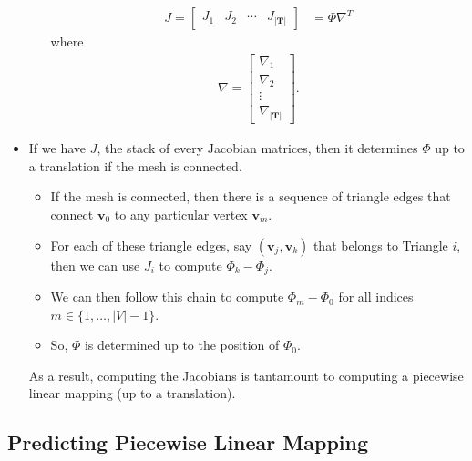 \documentclass[10pt]{article}
\newcommand{\ve}[1]{\mathbf{#1}}
\begin{document}
\begin{itemize}
\begin{itemize}
\begin{align*}
            J = \begin{bmatrix}
                J_1 & J_2 & \cdots & J_{|\ve{T}|}                
            \end{bmatrix}
            &= \Phi \nabla^T
        \end{align*}
        where
        \begin{align*}
            \nabla = \begin{bmatrix}
                \nabla_1 \\ \nabla_2 \\ \vdots \\ \nabla_{|\ve{T}|}
            \end{bmatrix}.
        \end{align*}
    \end{itemize}

    \item If we have $J$, the stack of every Jacobian matrices, then it determines $\Phi$ up to a translation if the mesh is connected.
    \begin{itemize}
        \item If the mesh is connected, then there is a sequence of triangle edges that connect $\ve{v}_0$ to any particular vertex $\ve{v}_m$.
        \item For each of these triangle edges, say $(\ve{v}_j, \ve{v}_k)$ that belongs to Triangle $i$, then we can use $J_i$ to compute $\Phi_k - \Phi_j$.
        \item We can then follow this chain to compute $\Phi_m - \Phi_0$ for all indices $m \in \{1, \dotsc, |V|-1\}$.
        \item So, $\Phi$ is determined up to the position of $\Phi_0$.
    \end{itemize}
    As a result, computing the Jacobians is tantamount to computing a piecewise linear mapping (up to a translation).
\end{itemize}

\subsection{Predicting Piecewise Linear Mapping}
\end{document}
